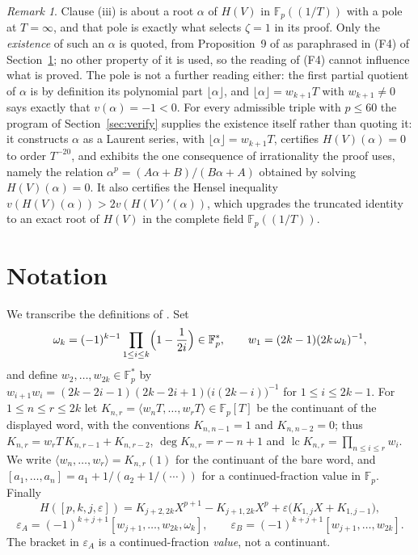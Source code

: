 \documentclass[11pt]{amsart}
\theoremstyle{remark}
\newtheorem*{remark}{Remark}
\DeclareMathOperator{\lc}{lc}
\newcommand{\Fp}{\mathbb F_p}
\newcommand{\Kc}[2]{K_{#1,#2}}
\newcommand{\HV}{H(V)}
\begin{document}
\begin{remark}
Clause (iii) is about a root $\alpha$ of $\HV$ in $\Fp((1/T))$ with a pole at $T=\infty$, and that
pole is exactly what selects $\zeta=1$ in its proof. Only the \emph{existence} of such an $\alpha$
is quoted, from Proposition~9 of \cite{L} as paraphrased in (F4) of Section~\ref{sec:notation}; no
other property of it is used, so the reading of (F4) cannot influence what is proved. The pole is
not a further reading either: the first partial quotient of $\alpha$ is by definition its polynomial
part $\lfloor\alpha\rfloor$, and $\lfloor\alpha\rfloor=w_{k+1}T$ with $w_{k+1}\ne0$ says exactly
that $v(\alpha)=-1<0$. For every admissible triple with $p\le60$ the program of
Section~\ref{sec:verify} supplies the existence itself rather than quoting it: it constructs
$\alpha$ as a Laurent series, with $\lfloor\alpha\rfloor=w_{k+1}T$, certifies $\HV(\alpha)=0$
to order $T^{-20}$, and exhibits the one consequence of irrationality the proof uses, namely the
relation $\alpha^p=(A\alpha+B)/(B\alpha+A)$ obtained by solving $\HV(\alpha)=0$. It also certifies
the Hensel inequality $v(\HV(\alpha))>2v(\HV'(\alpha))$, which upgrades the truncated identity to an
exact root of $\HV$ in the complete field $\Fp((1/T))$.
\end{remark}

\section{Notation}\label{sec:notation}

We transcribe the definitions of \cite{L}. Set
\[
 \omega_k=(-1)^{k-1}\prod_{1\le i\le k}\Bigl(1-\frac1{2i}\Bigr)\in\Fp^*,
 \qquad
 w_1=(2k-1)(2k\,\omega_k)^{-1},
\]
and define $w_2,\dots,w_{2k}\in\Fp^*$ by $w_{i+1}w_i=(2k-2i-1)(2k-2i+1)\bigl(i(2k-i)\bigr)^{-1}$
for $1\le i\le 2k-1$. For $1\le n\le r\le 2k$ let $\Kc nr=\langle w_nT,\dots,w_rT\rangle\in\Fp[T]$
be the continuant of the displayed word, with the conventions $\Kc n{n-1}=1$ and $\Kc n{n-2}=0$;
thus $\Kc nr=w_rT\,\Kc n{r-1}+\Kc n{r-2}$, $\deg\Kc nr=r-n+1$ and
$\lc\Kc nr=\prod_{n\le i\le r}w_i$. We write $\langle w_n,\dots,w_r\rangle=\Kc nr(1)$ for the
continuant of the bare word, and $[a_1,\dots,a_n]=a_1+1/(a_2+1/(\cdots))$ for a continued-fraction
value in $\Fp$. Finally
\[
 H([p,k,j,\varepsilon])=\Kc{j+2}{2k}X^{p+1}-\Kc{j+1}{2k}X^{p}
   +\varepsilon\bigl(\Kc1jX+\Kc1{j-1}\bigr),
\]
\[
 \varepsilon_A=(-1)^{k+j+1}[w_{j+1},\dots,w_{2k},\omega_k],
 \qquad
 \varepsilon_B=(-1)^{k+j+1}[w_{j+1},\dots,w_{2k}].
\]
The bracket in $\varepsilon_A$ is a continued-fraction \emph{value}, not a continuant.
\end{document}
